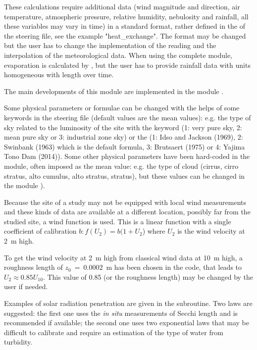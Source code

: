 These calculations require additional data (wind magnitude and direction, air
temperature, atmospheric pressure, relative humidity, nebulosity and rainfall,
all these variables may vary in time) in a standard format, rather defined
in the  of the  steering file,
see the example "heat\_exchange".
The format may be changed but the user has to change the
implementation of the reading and the interpolation of the meteorological data.
When using the complete module, evaporation is calculated by , but
the user has to provide rainfall data with units homogeneous with length over
time.

The main developments of this module are implemented in the module
.

Some physical parameters or formulae can be changed with the helps of some
keywords in the \waqtel steering file (default values are the mean values): e.g.
the type of sky related to the luminosity of the site with the \waqtel keyword
 (1: very pure sky, 2: mean pure sky or 3:
industrial zone sky) or the 
(1: Idso and Jackson (1969), 2: Swinbank (1963) which is the default formula,
3: Brutsaert (1975) or 4: Yajima Tono Dam (2014)).
Some other physical parameters have been hard-coded in the module, often
imposed as the mean value: e.g. the type of cloud (cirrus,
cirro stratus, alto cumulus, alto stratus, stratus), but these values can be
changed in the module ).

Because the site of a study may not be equipped with local wind measurements
and these kinds of data are available at a different location, possibly far
from the studied site, a wind function is used. This is a linear function with
a single coefficient of calibration $b:f(U_{2}) = b(1+U_{2}$) where $U_{2}$ is
the wind velocity at 2~m high.

To get the wind velocity at 2~m high from classical wind data at 10~m high, a
roughness length of ${z}_{0}~=~0.0002$~m has been chosen in the code,
that leads to $U_{2} \approx 0.85 U_{10}$. This value
of 0.85 (or the roughness length) may be changed by the user if needed.

Examples of solar radiation penetration are given in the
 subroutine. Two laws are suggested: the first one
uses the \emph{in situ} measurements of Secchi length and is
recommended if available; the second one uses two exponential laws that may be
difficult to calibrate and require an estimation of the type of water from
turbidity.

